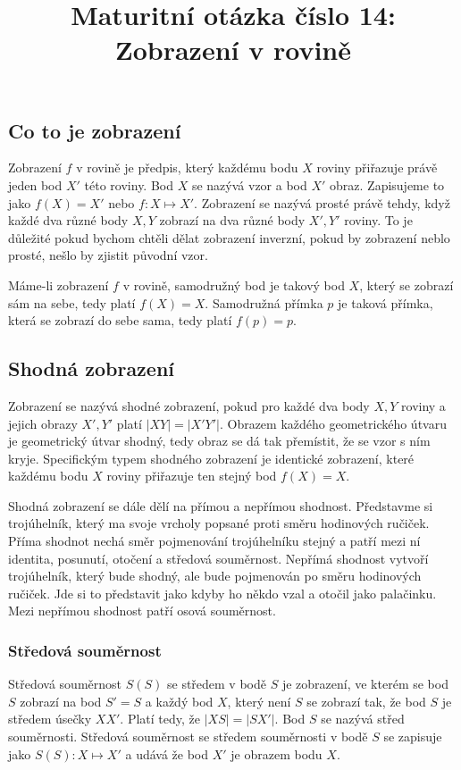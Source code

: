 \documentclass[12pt]{article}
\title{Maturitní otázka číslo 14: Zobrazení v rovině}
\author{}
\date{}
\begin{document}
\maketitle

\subsection*{Co to je zobrazení}
Zobrazení $f$ v rovině je předpis, který každému bodu $X$ roviny přiřazuje právě jeden bod $X'$ této
roviny. Bod $X$ se nazývá vzor a bod $X'$ obraz. Zapisujeme to jako $f(X) = X'$ nebo $f : X
\mapsto X'$. Zobrazení se nazývá prosté právě tehdy, když každé dva různé body $X, Y$ zobrazí na dva
různé body $X', Y'$ roviny. To je důležité pokud bychom chtěli dělat zobrazení inverzní, pokud by
zobrazení neblo prosté, nešlo by zjistit původní vzor.

Máme-li zobrazení $f$ v rovině, samodružný bod je takový bod $X$, který se zobrazí sám na sebe, tedy
platí $f(X) = X$. Samodružná přímka $p$ je taková přímka, která se zobrazí do sebe sama, tedy platí
$f(p) = p$.

\subsection*{Shodná zobrazení}
Zobrazení se nazývá shodné zobrazení, pokud pro každé dva body $X, Y$ roviny a jejich obrazy $X', Y'$
platí $|XY| = |X'Y'|$. Obrazem každého geometrického útvaru je geometrický útvar shodný, tedy obraz
se dá tak přemístit, že se vzor s ním kryje. Specifickým typem shodného zobrazení je identické
zobrazení, které každému bodu $X$ roviny přiřazuje ten stejný bod $f(X) = X$.

Shodná zobrazení se dále dělí na přímou a nepřímou shodnost. Představme si trojúhelník, který ma
svoje vrcholy popsané proti směru hodinových ručiček. Příma shodnot nechá směr pojmenování
trojúhelníku stejný a patří mezi ní identita, posunutí, otočení a středová souměrnost. Nepřímá
shodnost vytvoří trojúhelník, který bude shodný, ale bude pojmenován po směru hodinových ručiček. Jde
si to představit jako kdyby ho někdo vzal a otočil jako palačinku. Mezi nepřímou shodnost patří
osová souměrnost.
\subsubsection*{Středová souměrnost}
Středová souměrnost $S(S)$ se středem v bodě $S$ je zobrazení, ve kterém se bod $S$ zobrazí na bod
$S' = S$ a každý bod $X$, který není $S$ se zobrazí tak, že bod $S$ je středem úsečky $XX'$. Platí
tedy, že $|XS| = |SX'|$. Bod $S$ se nazývá střed souměrnosti. Středová souměrnost se středem
souměrnosti v bodě $S$ se zapisuje jako $S(S) : X \mapsto X'$ a udává že bod $X'$ je obrazem bodu $X$.
\end{document}

